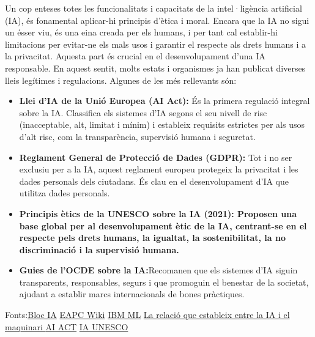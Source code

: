 Un cop enteses totes les funcionalitats i capacitats de la intel·ligència artificial (IA), és fonamental aplicar-hi principis d’ètica i moral. Encara que la IA no sigui un ésser viu, és una eina creada per els  humans, i per tant cal establir-hi limitacions per evitar-ne els mals usos i garantir el respecte als drets humans i a la privacitat. Aquesta part és crucial en el desenvolupament d’una IA responsable. En aquest sentit, molts estats i organismes ja han publicat diverses lleis legítimes i regulacions. Algunes de les més rellevants són:
 \begin{itemize}
  \item \textbf{Llei d’IA de la Unió Europea (AI Act):} És la primera regulació integral sobre la IA. Classifica els sistemes d’IA segons el seu nivell de risc (inacceptable, alt, limitat i mínim) i estableix requisits estrictes per als usos d’alt risc, com la transparència, supervisió humana i seguretat.
  \item \textbf{Reglament General de Protecció de Dades (GDPR):} Tot i no ser exclusiu per a la IA, aquest reglament europeu protegeix la privacitat i les dades personals dels ciutadans. És clau en el desenvolupament d’IA que utilitza dades personals.
  \item \textbf{Principis ètics de la UNESCO sobre la IA (2021): Proposen una base global per al desenvolupament ètic de la IA, centrant-se en el respecte pels drets humans, la igualtat, la sostenibilitat, la no discriminació i la supervisió humana.}
  \item \textbf{Guies de l’OCDE sobre la IA:}Recomanen que els sistemes d’IA siguin transparents, responsables, segurs i que promoguin el benestar de la societat, ajudant a establir marcs internacionals de bones pràctiques.
 \end{itemize}



Fonts:\href{https://blogs.uoc.edu/digitapia/the-european-unions-artificial-intelligence-act-explained/}{Bloc IA} \href{https://formaciooberta.eapc.gencat.cat/contingutsdelscursos/tdp/080_int_artificial/inici.html}{EAPC Wiki}
\href{https://www.ibm.com/think/topics/machine-learning}{IBM ML} \href{https://www.ultralytics.com/es/blog/understanding-the-impact-of-compute-power-on-ai-innovations}{La relació que estableix entre la IA i el maquinari }\cite{bengio2012} \href{https://digital-strategy.ec.europa.eu/en/policies/regulatory-framework-ai?utm_source=chatgpt.com}{AI ACT} \href{https://www.unesco.org/en/legal-affairs/recommendation-ethics-artificial-intelligence?utm_source=chatgpt.com}{IA UNESCO}

